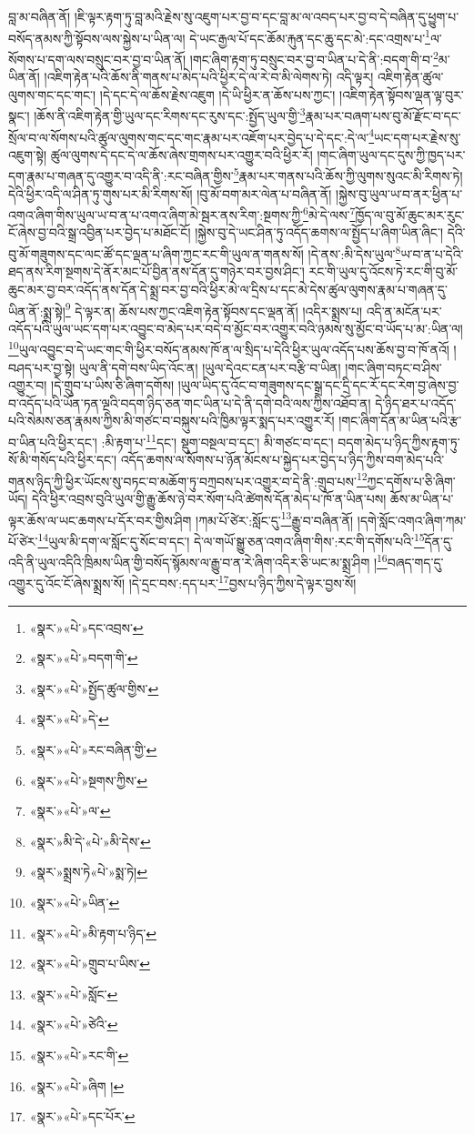 བླ་མ་བཞིན་ནོ། །ཇི་ལྟར་རྟག་ཏུ་བླ་མའི་རྗེས་སུ་འཇུག་པར་བྱ་བ་དང་བླ་མ་ལ་འབད་པར་བྱ་བ་དེ་བཞིན་དུ་ཕྱུག་པ་བསོད་ནམས་ཀྱི་སྟོབས་ལས་སྐྱེས་པ་ཡིན་ལ། དེ་ཡང་རྒྱལ་པོ་དང་ཆོམ་རྐུན་དང་ཆུ་དང་མེ་:དང་འགྲས་པ་\footnote{«སྣར་»«པེ་»དང་འབྲས་}ལ་སོགས་པ་དག་ལས་བསྲུང་བར་བྱ་བ་ཡིན་ནོ། །གང་ཞིག་རྟག་ཏུ་བསྲུང་བར་བྱ་བ་ཡིན་པ་དེ་ནི་:བདག་གི་བ་\footnote{«སྣར་»«པེ་»བདག་གི་}མ་ཡིན་ནོ། །འཇིག་རྟེན་པའི་ཆོས་ནི་གནས་པ་མེད་པའི་ཕྱིར་དེ་ལ་རེ་བ་མི་ལེགས་ཏེ། འདི་ལྟར། འཇིག་རྟེན་ཚུལ་ལུགས་གང་དང་གང་། །དེ་དང་དེ་ལ་ཆོས་རྗེས་འཇུག །དེ་ཡི་ཕྱིར་ན་ཆོས་པས་ཀྱང་། །འཇིག་རྟེན་སྟོབས་ལྡན་ལྟ་བུར་སྣང་། །ཆོས་ནི་འཇིག་རྟེན་གྱི་ཡུལ་དང་རིགས་དང་རུས་དང་:སྤྱོད་ཡུལ་གྱི་\footnote{«སྣར་»«པེ་»སྤྱོད་ཚུལ་གྱིས་}རྣམ་པར་བཞག་པས་བུ་མོ་རྫོང་བ་དང་སྲོལ་བ་ལ་སོགས་པའི་ཚུལ་ལུགས་གང་དང་གང་རྣམ་པར་འཇོག་པར་བྱེད་པ་དེ་དང་:དེ་ལ་\footnote{«སྣར་»«པེ་»དེ་}ཡང་དག་པར་རྗེས་སུ་འཇུག་སྟེ། ཚུལ་ལུགས་དེ་དང་དེ་ལ་ཆོས་ཞེས་གྲགས་པར་འགྱུར་བའི་ཕྱིར་རོ། །གང་ཞིག་ཡུལ་དང་དུས་ཀྱི་ཁྱད་པར་དག་རྣམ་པ་གཞན་དུ་འགྱུར་བ་འདི་ནི་:རང་བཞིན་གྱིས་\footnote{«སྣར་»«པེ་»རང་བཞིན་གྱི་}རྣམ་པར་གནས་པའི་ཆོས་ཀྱི་ལུགས་སུའང་མི་རིགས་ཏེ། དེའི་ཕྱིར་འདི་ལ་ཤིན་ཏུ་གུས་པར་མི་རིགས་སོ། །བུ་མོ་བག་མར་ལེན་པ་བཞིན་ནོ། །སྐྱེས་བུ་ཡུལ་ཡ་བ་ནར་ཕྱིན་པ་འགའ་ཞིག་གིས་ཡུལ་ཡ་བ་ན་པ་འགའ་ཞིག་མེ་སྦར་ནས་རིག་:སྔགས་ཀྱི་\footnote{«སྣར་»«པེ་»སྔགས་ཀྱིས་}མེ་དེ་ལས་\footnote{«སྣར་»«པེ་»ལ་}ཁྱོད་ལ་བུ་མོ་ཆུང་མར་རུང་ངོ་ཞེས་བྱ་བའི་སྒྲ་འབྱིན་པར་བྱེད་པ་མཐོང་ངོ། །སྐྱེས་བུ་དེ་ཡང་ཤིན་ཏུ་འདོད་ཆགས་ལ་སྤྱོད་པ་ཞིག་ཡིན་ཞིང་། དེའི་བུ་མོ་གཟུགས་དང་ལང་ཚོ་དང་ལྡན་པ་ཞིག་ཀྱང་རང་གི་ཡུལ་ན་གནས་སོ། །དེ་ནས་:མི་དེས་ཡུལ་\footnote{«སྣར་»མི་དེ་«པེ་»མི་དེས་}ཡ་བ་ན་པ་དེའི་ཐད་ནས་རིག་སྔགས་དེ་ནོར་མང་པོ་བྱིན་ནས་དོན་དུ་གཉེར་བར་བྱས་ཤིང་། རང་གི་ཡུལ་དུ་འོངས་ཏེ་རང་གི་བུ་མོ་ཆུང་མར་བྱ་བར་འདོད་ནས་དོན་དེ་སྨྲ་བར་བྱ་བའི་ཕྱིར་མེ་ལ་དྲིས་པ་དང་མེ་དེས་ཚུལ་ལུགས་རྣམ་པ་གཞན་དུ་ཡིན་ནོ་:སྨྲ་སྟེ།\footnote{«སྣར་»སྨྲས་ཏེ«པེ་»སྨ་ཏེ།} དེ་ལྟར་ན། ཆོས་པས་ཀྱང་འཇིག་རྟེན་སྟོབས་དང་ལྡན་ནོ། །འདིར་སྨྲས་པ། འདི་ན་མངོན་པར་འདོད་པའི་ཡུལ་ཡང་དག་པར་འབྱུང་བ་མེད་པར་བདེ་བ་མྱོང་བར་འགྱུར་བའི་ཉམས་སུ་མྱོང་བ་ཡོད་པ་མ་:ཡིན་ལ། \footnote{«སྣར་»«པེ་»ཡིན་}ཡུལ་འབྱུང་བ་དེ་ཡང་གང་གི་ཕྱིར་བསོད་ནམས་ཁོ་ན་ལ་སྲིད་པ་དེའི་ཕྱིར་ཡུལ་འདོད་པས་ཆོས་བྱ་བ་ཁོ་ནའོ། །བཤད་པར་བྱ་སྟེ། ཡུལ་ནི་དགེ་བས་ཡིད་འོང་ན། །ཡུལ་དེའང་ངན་པར་བརྩི་བ་ཡིན། །གང་ཞིག་བཏང་བ་ཤིས་འགྱུར་བ། །དེ་གྲུབ་པ་ཡིས་ཅི་ཞིག་དགོས། །ཡུལ་ཡིད་དུ་འོང་བ་གཟུགས་དང་སྒྲ་དང་དྲི་དང་རོ་དང་རེག་བྱ་ཞེས་བྱ་བ་འདོད་པའི་ཡོན་ཏན་ལྔའི་བདག་ཉིད་ཅན་གང་ཡིན་པ་དེ་ནི་དགེ་བའི་ལས་ཀྱིས་འཐོབ་ན། དེ་ཉིད་ཐར་པ་འདོད་པའི་སེམས་ཅན་རྣམས་ཀྱིས་མི་གཙང་བ་བསྐུས་པའི་ཁྱིམ་ལྟར་སྨད་པར་འགྱུར་རོ། །གང་ཞིག་དོན་མ་ཡིན་པའི་རྩ་བ་ཡིན་པའི་ཕྱིར་དང་། :མི་རྟག་པ་\footnote{«སྣར་»«པེ་»མི་རྟག་པ་ཉིད་}དང་། སྡུག་བསྔལ་བ་དང་། མི་གཙང་བ་དང་། བདག་མེད་པ་ཉིད་ཀྱིས་རྟག་ཏུ་སོ་མི་གསོད་པའི་ཕྱིར་དང་། འདོད་ཆགས་ལ་སོགས་པ་ཉོན་མོངས་པ་སྐྱེད་པར་བྱེད་པ་ཉིད་ཀྱིས་བག་མེད་པའི་གནས་ཉིད་ཀྱི་ཕྱིར་ཡོངས་སུ་བཏང་བ་མཆོག་ཏུ་བཀྲབས་པར་འགྱུར་བ་དེ་ནི་:གྲུབ་པས་\footnote{«སྣར་»«པེ་»གྲུབ་པ་ཡིས་}ཀྱང་དགོས་པ་ཅི་ཞིག་ཡོད། དེའི་ཕྱིར་འབྲས་བུའི་ཡུལ་གྱི་རྒྱུ་ཆོས་ཉེ་བར་སོག་པའི་ཚེགས་དོན་མེད་པ་ཁོ་ན་ཡིན་པས། ཆོས་མ་ཡིན་པ་ལྟར་ཆོས་ལ་ཡང་ཆགས་པ་དོར་བར་གྱིས་ཤིག །ཀམ་པོ་ཙེར་:སློང་དུ་\footnote{«སྣར་»«པེ་»སློང་}རྒྱུ་བ་བཞིན་ནོ། །དགེ་སློང་འགའ་ཞིག་ཀམ་པོ་ཙེར་\footnote{«སྣར་»«པེ་»ཙེའི་}ཡུལ་མི་དག་ལ་སློང་དུ་སོང་བ་དང་། དེ་ལ་གཡོ་སྒྱུ་ཅན་འགའ་ཞིག་གིས་:རང་གི་དགོས་པའི་\footnote{«སྣར་»«པེ་»རང་གི་}དོན་དུ་འདི་ནི་ཡུལ་འདིའི་ཁྲིམས་ཡིན་གྱི་བསོད་སྙོམས་ལ་རྒྱུ་བ་ན་རེ་ཞིག་འདིར་ཅི་ཡང་མ་སྨྲ་ཤིག །\footnote{«སྣར་»«པེ་»ཞིག །}བཞད་གད་དུ་འགྱུར་དུ་འོང་ངོ་ཞེས་སྨྲས་སོ། །དེ་དྲང་བས་:དད་པར་\footnote{«སྣར་»«པེ་»དང་པོར་}བྱས་པ་ཉིད་ཀྱིས་དེ་ལྟར་བྱས་སོ། 